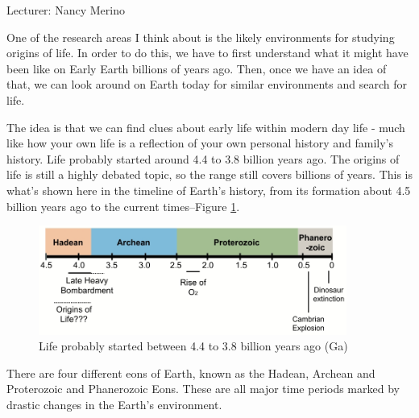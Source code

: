 \documentclass[]{article}
\begin{document}
Lecturer: Nancy Merino


One of the research areas I think about
is the likely environments
for studying origins of life.
In order to do this,
we have to first understand
what it might have been like
on Early Earth billions of years ago.
Then, once we have an idea of that,
we can look around on Earth today
for similar environments
and search for life.

The idea is that we can find clues
about early life within modern day life -
much like how your own life
is a reflection
of your own personal history
and family's history.
Life probably started
around 4.4 to 3.8 billion years ago. The origins of life is still
a highly debated topic,
so the range still covers
billions of years.
This is what's shown here
in the timeline of Earth's history,
from its formation
about 4.5 billion years ago
to the current times--Figure \ref{fig:LifeProbablyStarted}.


\begin{figure}[H]
	\caption[Life probably started between 4.4 to 3.8 billion years ago]{Life probably started between 4.4 to 3.8 billion years ago (Ga) \cite{domagal2016astrobiology}} \label{fig:LifeProbablyStarted}
	\includegraphics[width=0.9\textwidth]{LifeProbablyStarted}
\end{figure}

There are four different eons of Earth,
known as the Hadean, Archean
and Proterozoic and Phanerozoic Eons.
These are all major time periods
marked by drastic changes
in the Earth's environment.
\end{document}
